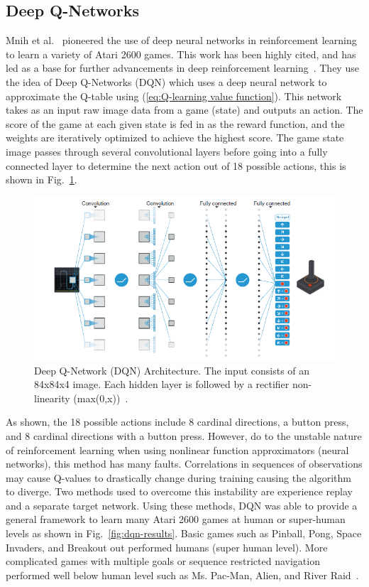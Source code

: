 \documentclass[12pt,american]{report}
\begin{document}
\subsection{Deep Q-Networks}
\label{sec:dqn}
Mnih et al.~\cite{atari} pioneered the use of deep neural networks in reinforcement learning to learn a variety of Atari 2600 games.  This work has been highly cited, and has led as a base for further advancements in deep reinforcement learning~\cite{atari}.  They use the idea of Deep Q-Networks (DQN) which uses a deep neural network to approximate the Q-table using (\ref{eq:Q-learning value function}). This network takes as an input raw image data from a game (state) and outputs an action. The score of the game at each given state is fed in as the reward function, and the weights are iteratively optimized to achieve the highest score. The game state image passes through several convolutional layers before going into a fully connected layer to determine the next action out of 18 possible actions, this is shown in Fig.~\ref{fig:DQN-atari}.
\begin{figure}
\centering
\includegraphics[scale=.95]{images/DQN-atari.png}
\caption{Deep Q-Network (DQN) Architecture. The input consists of an 84x84x4 image. Each hidden layer is followed by a rectifier non-linearity (max(0,x))~\cite{atari}.}
\label{fig:DQN-atari}
\end{figure}
As shown, the 18 possible actions include 8 cardinal directions, a button press, and 8 cardinal directions with a button press. However, do to the unstable nature of reinforcement learning when using nonlinear function approximators (neural networks), this method has many faults. Correlations in sequences of observations may cause Q-values to drastically change during training causing the algorithm to diverge. Two methods used to overcome this instability are experience replay and a separate target network. Using these methods, DQN was able to provide a general framework to learn many Atari 2600 games at human or super-human levels as shown in Fig.~\ref{fig:dqn-results}. Basic games such as Pinball, Pong, Space Invaders, and Breakout out performed humans (super human level). More complicated games with multiple goals or sequence restricted navigation performed well below human level such as Ms. Pac-Man, Alien, and River Raid~\cite{atari}.
\end{document}
